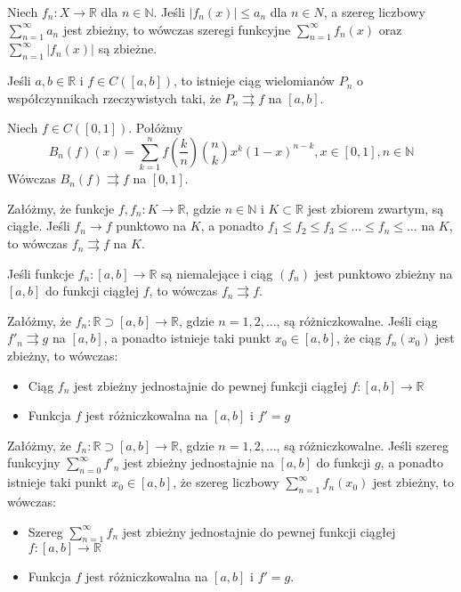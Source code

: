 \documentclass[12pt]{article}
\newcommand{\N}{\mathbb{N}}
\newcommand{\R}{\mathbb{R}}
\begin{document}
Niech  $f_n : X \rightarrow \R$ dla $n \in \N$.
Jeśli $|f_n(x)| \leq a_n$ dla $n \in N$,
a szereg liczbowy $\sum_{n=1}^\infty a_n$ jest zbieżny, to wówczas szeregi funkcyjne
$\sum_{n=1}^\infty f_n(x)$ oraz $\sum_{n=1}^\infty |f_n(x)|$ są zbieżne.

Jeśli $a, b \in \R$ i $f \in C([a, b])$, to istnieje ciąg wielomianów $P_n$ o współczynnikach rzeczywistych taki, że $P_n \rightrightarrows f$ na $[a, b]$.

Niech $f \in C([0, 1])$. Połóżmy
$$B_n(f)(x) = \sum_{k=1}^n f\left(\frac{k}{n}\right) \binom{n}{k} x^k (1 - x)^{n-k}
, x \in [0, 1], n \in \N$$
Wówczas $B_n(f) \rightrightarrows f$ na $[0, 1]$.

Załóżmy, że funkcje $f, f_n : K \rightarrow \R$, gdzie $n \in \N$ i $K \subset \R$ jest zbiorem zwartym, są ciągłe. Jeśli $f_n \rightarrow f$ punktowo na $K$, a ponadto $f_1 \leq f_2 \leq f_3 \leq \ldots \leq f_n \leq \ldots$ na $K$,
to wówczas $f_n \rightrightarrows f$ na $K$.

Jeśli funkcje $f_n : [a, b] \rightarrow \R$ są niemalejące i ciąg $(f_n)$ jest punktowo zbieżny na $[a, b]$ do funkcji ciągłej $f$, to wówczas $f_n \rightrightarrows f$.

\theorem{}
Załóżmy, że $f_n : \R \supset [a, b] \rightarrow \R$, gdzie $n = 1, 2, \ldots$, są różniczkowalne.
Jeśli ciąg $f'_n \rightrightarrows g$ na $[a, b]$, a ponadto istnieje taki punkt $x_0 \in [a, b]$, że ciąg $f_n(x_0)$ jest zbieżny, to wówczas:
\begin{itemize}
    \item Ciąg $f_n$ jest zbieżny jednostajnie do pewnej funkcji ciągłej $f : [a, b] \rightarrow \R$
    \item Funkcja $f$ jest różniczkowalna na $[a, b]$ i $f' = g$
\end{itemize}

\theorem{}
Załóżmy, że $f_n : \R \supset [a, b] \rightarrow \R$, gdzie $n = 1, 2, \ldots$, są różniczkowalne. Jeśli szereg funkcyjny $\sum_{n=0}^\infty f'_n$ jest zbieżny jednostajnie na $[a, b]$ do funkcji $g$, a ponadto istnieje taki punkt $x_0 \in [a, b]$, że szereg liczbowy $\sum_{n=1}^\infty f_n(x_0)$ jest zbieżny, to wówczas:
\begin{itemize}
    \item Szereg $\sum_{n=1}^\infty f_n$ jest zbieżny jednostajnie do pewnej funkcji ciągłej $f : [a, b] \rightarrow \R$
    \item Funkcja $f$ jest różniczkowalna na $[a, b]$ i $f' = g$.
\end{itemize}
\end{document}
